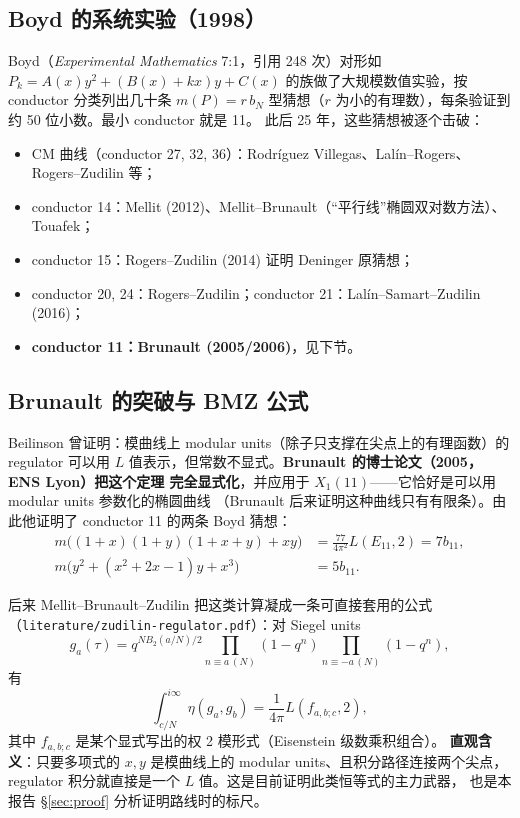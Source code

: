 \documentclass[11pt,a4paper]{ctexart}
\theoremstyle{remark}
\newcommand{\EE}{E_{11}}
\newcommand{\bN}{b_{11}}
\begin{document}
\subsection{Boyd 的系统实验（1998）}

Boyd（\emph{Experimental Mathematics} 7:1，引用 248 次）对形如
$P_k=A(x)y^2+(B(x)+kx)y+C(x)$ 的族做了大规模数值实验，按 conductor 分类列出几十条
$m(P)=r\,b_N$ 型猜想（$r$ 为小的有理数），每条验证到约 50 位小数。最小 conductor 就是 11。
此后 25 年，这些猜想被逐个击破：
\begin{itemize}[nosep]
\item CM 曲线（conductor 27, 32, 36）：Rodr\'iguez Villegas、Lal\'in--Rogers、Rogers--Zudilin 等；
\item conductor 14：Mellit (2012)、Mellit--Brunault（“平行线”椭圆双对数方法）、Touafek；
\item conductor 15：Rogers--Zudilin (2014) 证明 Deninger 原猜想；
\item conductor 20, 24：Rogers--Zudilin；conductor 21：Lal\'in--Samart--Zudilin (2016)；
\item \textbf{conductor 11：Brunault (2005/2006)}，见下节。
\end{itemize}

\subsection{Brunault 的突破与 BMZ 公式}\label{sec:bmz}

Beilinson 曾证明：模曲线上 modular units（除子只支撑在尖点上的有理函数）的 regulator
可以用 $L$ 值表示，但常数不显式。\textbf{Brunault 的博士论文（2005，ENS Lyon）把这个定理
完全显式化}，并应用于 $X_1(11)$——它恰好是可以用 modular units 参数化的椭圆曲线
（Brunault 后来证明这种曲线只有有限条）。由此他证明了 conductor 11 的两条 Boyd 猜想：
\begin{align}
m\big((1+x)(1+y)(1+x+y)+xy\big)&=\frac{77}{4\pi^2}L(\EE,2)=7\bN, \tag{C1}\label{C1}\\
m\big(y^2+(x^2+2x-1)y+x^3\big)&=5\bN. \tag{C2}\label{C2}
\end{align}

后来 Mellit--Brunault--Zudilin 把这类计算凝成一条可直接套用的公式
（\texttt{literature/zudilin-regulator.pdf}）：对 Siegel units
\[
g_a(\tau)=q^{NB_2(a/N)/2}\prod_{n\equiv a\,(N)}(1-q^n)\prod_{n\equiv -a\,(N)}(1-q^n),
\]
有
\[
\int_{c/N}^{i\infty}\eta(g_a,g_b)=\frac1{4\pi}L(f_{a,b;c},2),
\]
其中 $f_{a,b;c}$ 是某个显式写出的权 2 模形式（Eisenstein 级数乘积组合）。
\textbf{直观含义}：只要多项式的 $x,y$ 是模曲线上的 modular units、且积分路径连接两个尖点，
regulator 积分就直接是一个 $L$ 值。这是目前证明此类恒等式的主力武器，
也是本报告 \S\ref{sec:proof} 分析证明路线时的标尺。
\end{document}
